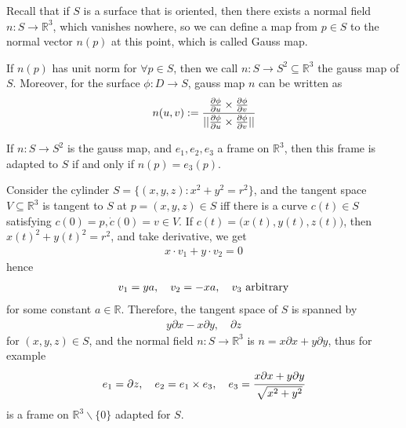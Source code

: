 \documentclass[10pt]{article}
\begin{document}
		Recall that if $S$ is a surface that is oriented, then there exists a normal field $n: S\rightarrow\mathbb{R}^3$, which vanishes nowhere, so we can define a map from $p\in S$ to the normal vector $n(p)$ at this point, which is called Gauss map.
		
		\begin{definition}
			If $n(p)$ has unit norm for $\forall p\in S$, then we call $n: S\rightarrow S^2\subseteq\mathbb{R}^3$ the gauss map of $S$. Moreover, for the surface $\phi: D\rightarrow S$, gauss map $n$ can be written as
			\begin{equation*}
				\begin{aligned}
					n(u, v) := \cfrac{\frac{\partial\phi}{\partial u}\times\frac{\partial\phi}{\partial v}}{||\frac{\partial\phi}{\partial u}\times\frac{\partial\phi}{\partial v}||}
				\end{aligned}
			\end{equation*}
		\end{definition}
	
		\begin{remark}
			If $n: S\rightarrow S^2$ is the gauss map, and $e_1, e_2, e_3$ a frame on $\mathbb{R}^3$, then this frame is adapted to $S$ if and only if $n(p) = e_3(p)$.
		\end{remark}
	
		\begin{example}
			Consider the cylinder $S = \{(x,y,z): x^2+y^2=r^2\}$, and the tangent space $V\subseteq\mathbb{R}^3$ is tangent to $S$ at $p=(x,y,z)\in S$ iff there is a curve $c(t)\in S$ satisfying $c(0)=p, \dot{c}(0)=v\in V$. If $c(t) = \big(x(t), y(t), z(t)\big)$, then $x(t)^2+y(t)^2=r^2$, and take derivative, we get
			\begin{equation*}
				\begin{aligned}
					x\cdot v_1 + y\cdot v_2 = 0
				\end{aligned}
			\end{equation*}
			hence
			\begin{equation*}
				\begin{aligned}
					v_1 = ya, \quad v_2 = -xa, \quad v_3 \thinspace\thinspace\text{arbitrary}
				\end{aligned}
			\end{equation*}
			for some constant $a\in\mathbb{R}$. Therefore, the tangent space of $S$  is spanned by
			\begin{equation*}
				\begin{aligned}
					y\partial x-x\partial y, \quad \partial z
				\end{aligned}
			\end{equation*}
			for $(x,y,z)\in S$, and the normal field $n: S\rightarrow\mathbb{R}^3$ is $n = x\partial x+y\partial y$, thus for example
			\begin{equation*}
				\begin{aligned}
					e_1 = \partial z,\quad e_2 = e_1\times e_3,\quad e_3 = \cfrac{x\partial x + y\partial y}{\sqrt{x^2+y^2}}
				\end{aligned}
			\end{equation*}
			is a frame on $\mathbb{R}^3\backslash \{0\}$ adapted for $S$.
		\end{example}
	
\end{document}
